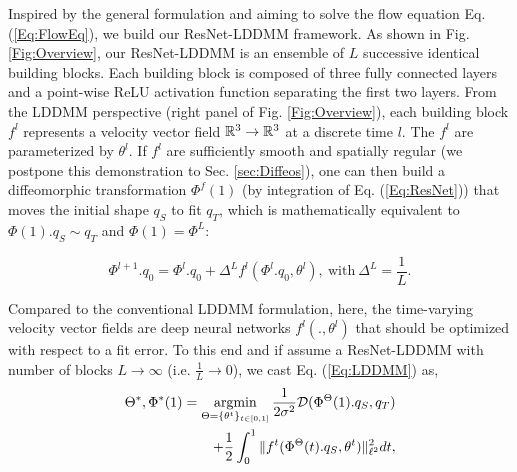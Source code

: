 Inspired by the general formulation and aiming to solve the flow equation Eq. (\ref{Eq:FlowEq}), we build our ResNet-LDDMM framework. As shown in Fig. \ref{Fig:Overview}, our ResNet-LDDMM is an ensemble of $L$ successive identical building blocks. Each building block is composed of three fully connected layers and a point-wise ReLU activation function separating the first two layers. From the LDDMM perspective (right panel of Fig. \ref{Fig:Overview}), each building block ${f^l}$ represents a velocity vector field $\mathbb{R}^3\rightarrow\mathbb{R}^3$ at a discrete time $l$. The $f^l$ are   parameterized by $\theta^l$. If $f^l$ are sufficiently smooth and spatially regular (we postpone this demonstration to Sec. \ref{sec:Diffeos}), one can then build a diffeomorphic transformation $\Phi^f(1)$ (by integration of Eq. (\ref{Eq:ResNet})) that moves the initial shape $q_S$ to fit $q_T$, which is mathematically equivalent to $\Phi(1).q_S \sim q_T$ and  $\Phi(1)=\Phi^L$:

\begin{equation}
\Phi^{l+1}.q_0 = \Phi^{l}.q_0 + \Delta^L f^l(\Phi^{l}.q_0,\theta^{l}),\ \text{with}\ \Delta^L=\frac{1}{L}.
\label{Eq:ResNet}
\end{equation}

Compared to the conventional LDDMM formulation, here, the time-varying velocity vector fields are deep neural networks $f^l(.,\theta^l)$ that should be optimized with respect to a fit error. To this end and if assume a ResNet-LDDMM with number of blocks $L \to \infty$ (i.e. $\frac{1}{L}\to 0$), we cast Eq. (\ref{Eq:LDDMM}) as,  
\begin{equation}
\begin{split}
\Theta^*, \Phi^*(1)=\argmin_{\Theta=\{\theta^t\}_{t \in [0,1]}}\frac{1}{2\sigma^2}\mathcal{D}(\Phi^{\Theta}(1).q_S,q_{T})\\
+\frac{1}{2} \int_{0}^{1}  \| f^t(\Phi^{\Theta}(t).q_S,\theta^{t}) \|_{\ell^2}^2 dt, %
\end{split}
\label{Eq:ResNet-LDDMM}
\end{equation}


